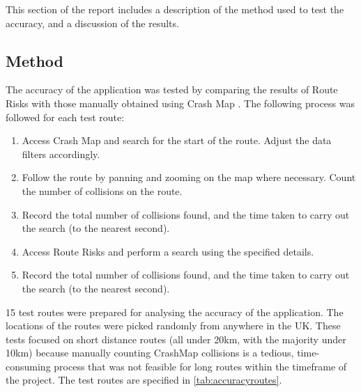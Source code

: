 \documentclass[authoryearcitations]{UoYCSproject}
\begin{document}
This section of the report includes a description of the method used to test the accuracy, and a discussion of the results.

\subsection{Method}

The accuracy of the application was tested by comparing the results of Route Risks with those manually obtained using Crash Map \citep{crashmap}. The following process was followed for each test route:

\begin{enumerate}
	\item Access Crash Map and search for the start of the route. Adjust the data filters accordingly.
	\item Follow the route by panning and zooming on the map where necessary. Count the number of collisions on the route.
	\item Record the total number of collisions found, and the time taken to carry out the search (to the nearest second).
	\item Access Route Risks and perform a search using the specified details.
	\item Record the total number of collisions found, and the time taken to carry out the search (to the nearest second).
\end{enumerate}

15 test routes were prepared for analysing the accuracy of the application. The locations of the routes were picked randomly from anywhere in the UK. These tests focused on short distance routes (all under 20km, with the majority under 10km) because manually counting CrashMap collisions is a tedious, time-consuming process that was not feasible for long routes within the timeframe of the project. The test routes are specified in \autoref{tab:accuracyroutes}.
\end{document}
